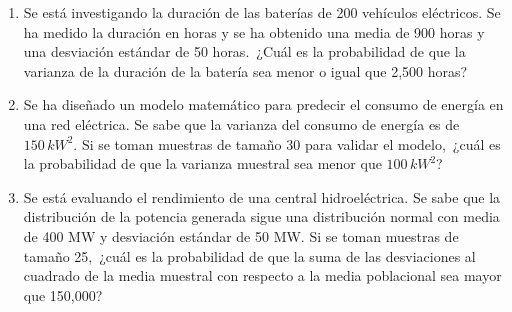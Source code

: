 \begin{Ejer}
\begin{enumerate}
\item Se est\'a investigando la duraci\'on de las bater\'ias de 200 veh\'iculos el\'ectricos. Se ha medido la duraci\'on en horas y se ha obtenido una media de 900 horas y una desviaci\'on est\'andar de 50 horas. \,¿Cu\'al es la probabilidad de que la varianza de la duraci\'on de la bater\'ia sea menor o igual que 2{,}500 horas?

\item Se ha dise\~nado un modelo matem\'atico para predecir el consumo de energ\'ia en una red el\'ectrica. Se sabe que la varianza del consumo de energ\'ia es de $150\, kW^2$. Si se toman muestras de tama\~no 30 para validar el modelo, \,¿cu\'al es la probabilidad de que la varianza muestral sea menor que $100\, kW^2$?

\item Se est\'a evaluando el rendimiento de una central hidroel\'ectrica. Se sabe que la distribuci\'on de la potencia generada sigue una distribuci\'on normal con media de 400 MW y desviaci\'on est\'andar de 50 MW. Si se toman muestras de tama\~no 25, \,¿cu\'al es la probabilidad de que la suma de las desviaciones al cuadrado de la media muestral con respecto a la media poblacional sea mayor que 150{,}000?

\end{enumerate}
\end{Ejer} 


